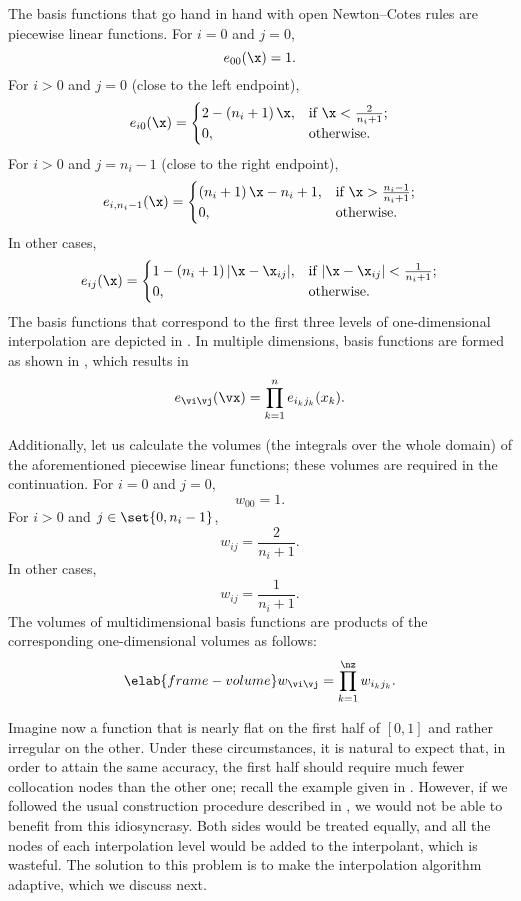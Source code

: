 The basis functions that go hand in hand with open Newton--Cotes rules are
piecewise linear functions. For $i = 0$ and $j = 0$,
\[
  e_{00}(\x) = 1.
\]
For $i > 0$ and $j = 0$ (close to the left endpoint),
\[
  e_{i0}(\x) =
  \begin{cases}
    2 - \left(n_i + 1\right) \x, & \text{if } \x < \frac{2}{n_i + 1}; \\
    0, & \text{otherwise}.
  \end{cases}
\]
For $i > 0$ and $j = n_i - 1$ (close to the right endpoint),
\[
  e_{i, n_i - 1}(\x) =
  \begin{cases}
    \left(n_i + 1\right) \x - n_i + 1, & \text{if } \x > \frac{n_i - 1}{n_i + 1}; \\
    0, & \text{otherwise}.
  \end{cases}
\]
In other cases,
\[
  e_{ij}(\x) =
  \begin{cases}
    1 - \left(n_i + 1\right)|\x - \x_{ij}|, & \text{if } |\x - \x_{ij}| < \frac{1}{n_i + 1}; \\
    0, & \text{otherwise}.
  \end{cases}
\]
The basis functions that correspond to the first three levels of one-dimensional
interpolation are depicted in . In multiple dimensions, basis
functions are formed as shown in , which results in
\[
  e_{\vi \vj}(\vx) = \prod_{k = 1}^n e_{i_k j_k}(x_k).
\]

Additionally, let us calculate the volumes (the integrals over the whole domain)
of the aforementioned piecewise linear functions; these volumes are required in
the continuation. For $i = 0$ and $j = 0$,
\[
  w_{00} = 1.
\]
For $i > 0$ and $j \in \set{0, n_i - 1}$,
\[
  w_{ij} = \frac{2}{n_i + 1}.
\]
In other cases,
\[
  w_{ij} = \frac{1}{n_i + 1}.
\]
The volumes of multidimensional basis functions are products of the
corresponding one-dimensional volumes as follows:
\begin{equation} \elab{frame-volume}
  w_{\vi \vj} = \prod_{k = 1}^\nz w_{i_k j_k}.
\end{equation}

Imagine now a function that is nearly flat on the first half of $[0, 1]$ and
rather irregular on the other. Under these circumstances, it is natural to
expect that, in order to attain the same accuracy, the first half should require
much fewer collocation nodes than the other one; recall the example given in
. However, if we followed the usual construction
procedure described in , we would not be able to
benefit from this idiosyncrasy. Both sides would be treated equally, and all the
nodes of each interpolation level would be added to the interpolant, which is
wasteful. The solution to this problem is to make the interpolation algorithm
adaptive, which we discuss next.

